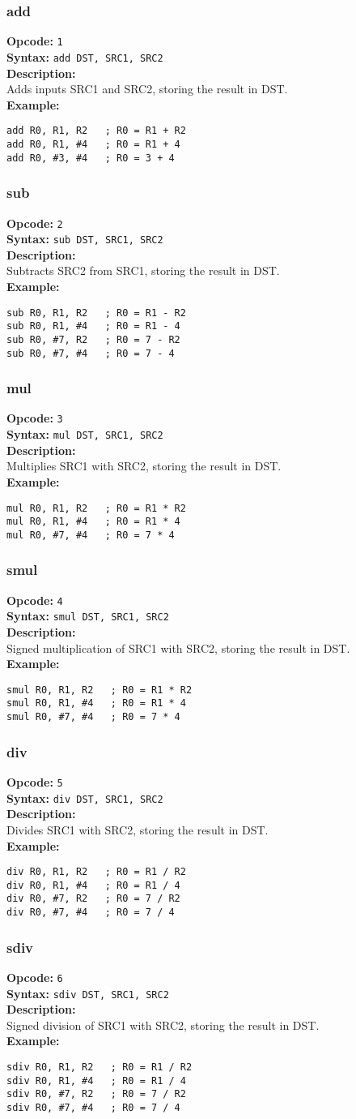 \documentclass[a4paper,12pt]{article}
\newcommand{\syntax}[1]{
  \noindent\textbf{Syntax:} \texttt{#1}\\
}
\newcommand{\desc}[1]{
  \noindent\textbf{Description:}\\
  #1\\
  \noindent\textbf{Example:}}
\newenvironment{instruction}[2]{
  \subsubsection{#1}
  \noindent\textbf{Opcode:} \texttt{#2}\\}{}
\begin{document}
\newpage
\begin{instruction}{add}{1}
\syntax{add DST, SRC1, SRC2}
\desc{Adds inputs SRC1 and SRC2, storing the result in DST.}
\begin{verbatim}
add R0, R1, R2   ; R0 = R1 + R2
add R0, R1, #4   ; R0 = R1 + 4
add R0, #3, #4   ; R0 = 3 + 4
\end{verbatim}
\end{instruction}

\begin{instruction}{sub}{2}
\syntax{sub DST, SRC1, SRC2}
\desc{Subtracts SRC2 from SRC1, storing the result in DST.}
\begin{verbatim}
sub R0, R1, R2   ; R0 = R1 - R2
sub R0, R1, #4   ; R0 = R1 - 4
sub R0, #7, R2   ; R0 = 7 - R2
sub R0, #7, #4   ; R0 = 7 - 4
\end{verbatim}
\end{instruction}

\begin{instruction}{mul}{3}
\syntax{mul DST, SRC1, SRC2}
\desc{Multiplies SRC1 with SRC2, storing the result in DST.}
\begin{verbatim}
mul R0, R1, R2   ; R0 = R1 * R2
mul R0, R1, #4   ; R0 = R1 * 4
mul R0, #7, #4   ; R0 = 7 * 4
\end{verbatim}
\end{instruction}

\begin{instruction}{smul}{4}
\syntax{smul DST, SRC1, SRC2}
\desc{Signed multiplication of SRC1 with SRC2, storing the result in DST.}
\begin{verbatim}
smul R0, R1, R2   ; R0 = R1 * R2
smul R0, R1, #4   ; R0 = R1 * 4
smul R0, #7, #4   ; R0 = 7 * 4
\end{verbatim}
\end{instruction}

\begin{instruction}{div}{5}
\syntax{div DST, SRC1, SRC2}
\desc{Divides SRC1 with SRC2, storing the result in DST.}
\begin{verbatim}
div R0, R1, R2   ; R0 = R1 / R2
div R0, R1, #4   ; R0 = R1 / 4
div R0, #7, R2   ; R0 = 7 / R2
div R0, #7, #4   ; R0 = 7 / 4
\end{verbatim}
\end{instruction}

\begin{instruction}{sdiv}{6}
\syntax{sdiv DST, SRC1, SRC2}
\desc{Signed division of SRC1 with SRC2, storing the result in DST.}
\begin{verbatim}
sdiv R0, R1, R2   ; R0 = R1 / R2
sdiv R0, R1, #4   ; R0 = R1 / 4
sdiv R0, #7, R2   ; R0 = 7 / R2
sdiv R0, #7, #4   ; R0 = 7 / 4
\end{verbatim}
\end{instruction}
\end{document}
